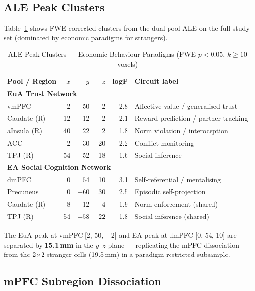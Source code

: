 \documentclass[11pt,a4paper]{article}
\begin{document}
\subsection{ALE Peak Clusters}

Table~\ref{tab:ale_econ} shows FWE-corrected clusters from the dual-pool ALE on the full
study set (dominated by economic paradigms for strangers).

\begin{table}[ht]
\centering\small
\caption{ALE Peak Clusters — Economic Behaviour Paradigms (FWE $p<0.05$, $k\geq10$ voxels)}
\label{tab:ale_econ}
\renewcommand{\arraystretch}{1.25}
\begin{tabular}{lrrrrl}
\toprule
\textbf{Pool / Region} & $x$ & $y$ & $z$ & \textbf{logP} & \textbf{Circuit label} \\
\midrule
\multicolumn{6}{l}{\textcolor{euaBlue}{\textbf{EuA Trust Network}}} \\
vmPFC              &  2 & 50 & $-$2 & 2.8 & Affective value / generalised trust \\
Caudate (R)        & 12 & 12 &  2   & 2.1 & Reward prediction / partner tracking \\
aInsula (R)        & 40 & 22 &  2   & 1.8 & Norm violation / interoception \\
ACC                &  2 & 30 & 20   & 2.2 & Conflict monitoring \\
TPJ (R)            & 54 & $-$52 & 18 & 1.6 & Social inference \\
\midrule
\multicolumn{6}{l}{\textcolor{eaRed}{\textbf{EA Social Cognition Network}}} \\
dmPFC              &  0 & 54 & 10   & 3.1 & Self-referential / mentalising \\
Precuneus          &  0 & $-$60 & 30 & 2.5 & Episodic self-projection \\
Caudate (R)        &  8 & 12 &  4   & 1.9 & Norm enforcement (shared) \\
TPJ (R)            & 54 & $-$58 & 22 & 1.8 & Social inference (shared) \\
\bottomrule
\end{tabular}
\end{table}

The EuA peak at vmPFC [2, 50, $-$2] and EA peak at dmPFC [0, 54, 10] are separated by
\textbf{15.1\,mm} in the $y$--$z$ plane — replicating the mPFC dissociation from the
2$\times$2 stranger cells (19.5\,mm) in a paradigm-restricted subsample.

\subsection{mPFC Subregion Dissociation}
\end{document}
